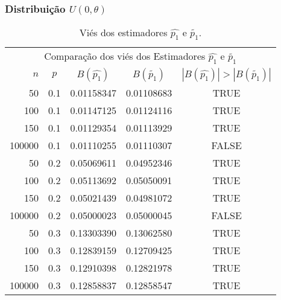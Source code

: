 \begin{frame}
\frametitle{Distribuição $U(0,\theta)$}
\tiny
\begin{table}[h]
\caption{Viés dos estimadores $\hat{p_{1}}$ e $\tilde{p_{1}}$.}
\label{tab:p1Vies}
\centering
\begin{tabular}{rcccc}
\toprule
\multicolumn{5}{c}{Comparação dos viés dos Estimadores $\hat{p_{1}}$ e $\tilde{p_{1}}$}\\
$n$ & $p$ & $B(\hat{p_{1}})$ & $B(\tilde{p_{1}})$ & $|B(\hat{p_{1}})|>|B(\tilde{p_{1}})|$ \\
\midrule
50 & 0.1 & 0.01158347 & 0.01108683 & TRUE \\
100 & 0.1 & 0.01147125 & 0.01124116 & TRUE \\
150 & 0.1 & 0.01129354 & 0.01113929 & TRUE \\
100000 & 0.1 & 0.01110255 & 0.01110307 & FALSE \\
\midrule
50 & 0.2 & 0.05069611 & 0.04952346 & TRUE \\
100 & 0.2 & 0.05113692 & 0.05050091 & TRUE \\
150 & 0.2 & 0.05021439 & 0.04981072 & TRUE\\
100000 & 0.2 & 0.05000023 & 0.05000045 & FALSE \\
\midrule
50 & 0.3 & 0.13303390 & 0.13062580 & TRUE \\
100 & 0.3 & 0.12839159 & 0.12709425 & TRUE \\
150 & 0.3 & 0.12910398 & 0.12821978 & TRUE \\
100000 & 0.3 & 0.12858837 & 0.12858547 & TRUE \\
\bottomrule
\end{tabular}
\end{table}
\end{frame}

